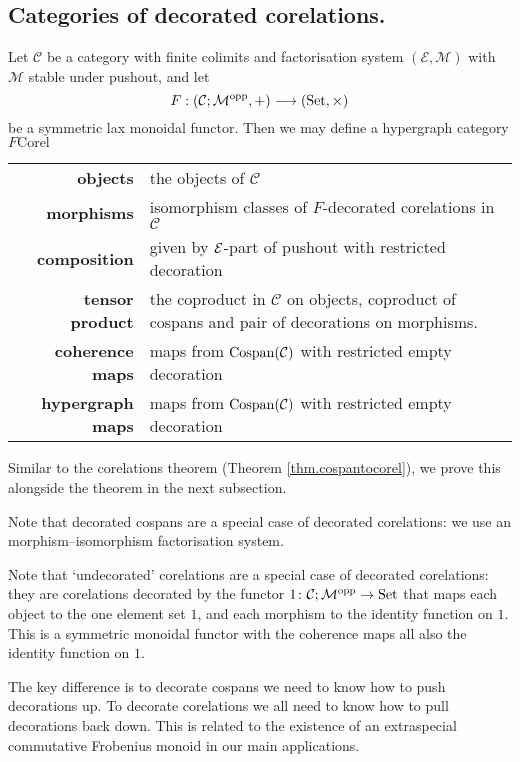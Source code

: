 \subsection{Categories of decorated corelations.}
\begin{theorem}
  Let $\mathcal C$ be a category with finite colimits and factorisation system
  $(\mathcal E, \mathcal M)$ with $\mathcal M$ stable under pushout, and let 
  \[
    F: (\mathcal C;\mathcal M^{\mathrm{opp}},+) \longrightarrow (\mathrm{Set}, \times)
  \]
  be a symmetric lax monoidal functor.  Then we may define a hypergraph category
  $F\mathrm{Corel}$
  
  \begin{tabular}{ r p{}}
    \textbf{objects} & the objects of $\mathcal C$ \\ 
    \textbf{morphisms} & isomorphism classes of $F$-decorated corelations in
    $\mathcal C$\\ 
  \textbf{composition} & given by $\mathcal E$-part of pushout with restricted
  decoration  \\
  \textbf{tensor product} & the coproduct in $\mathcal C$ on objects, coproduct
  of cospans and pair of decorations on morphisms. \\
  \textbf{coherence maps} & maps from $\operatorname{{Cospan}}(\mathcal C)$ with restricted empty
  decoration \\
  \textbf{hypergraph maps} & maps from $\operatorname{{Cospan}}(\mathcal C)$ with restricted empty
  decoration
  \end{tabular}
\end{theorem}
Similar to the corelations theorem (Theorem \ref{thm.cospantocorel}), we prove
this alongside the theorem in the next subsection.
\begin{example}
  Note that decorated cospans are a special case of decorated corelations: we
  use an morphism--isomorphism factorisation system.
\end{example}

\begin{example} \label{ex.undeccorel}
  Note that `undecorated' corelations are a special case of decorated
  corelations: they are corelations decorated by the functor $1{\colon} \mathcal C;\mathcal
  M^{\mathrm{opp}} \to \mathrm{Set}$ that maps each object to the one element set $1$, and each
  morphism to the identity function on $1$. This is a symmetric monoidal functor
  with the coherence maps all also the identity function on $1$.
\end{example}

The key difference is to decorate cospans we need to know how to push
decorations up. To decorate corelations we all need to know how to pull
decorations back down. This is related to the existence of an extraspecial
commutative Frobenius monoid in our main applications.

